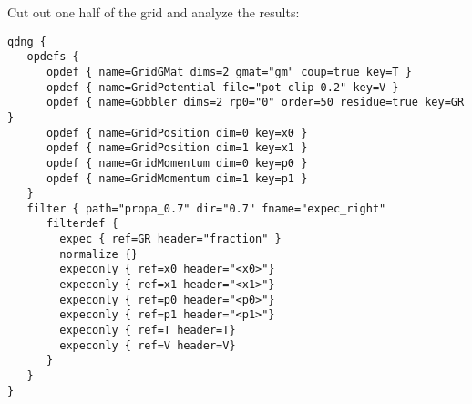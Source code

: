 \documentclass[a4paper,12pt]{scrbook}
\begin{document}
Cut out one half of the grid and analyze the results:
\begin{verbatim}
qdng {                                                                                                                                       
   opdefs {                                                                                                                                  
      opdef { name=GridGMat dims=2 gmat="gm" coup=true key=T }                                      
      opdef { name=GridPotential file="pot-clip-0.2" key=V }                                        
      opdef { name=Gobbler dims=2 rp0="0" order=50 residue=true key=GR }                                                                     
      opdef { name=GridPosition dim=0 key=x0 }                                                                                               
      opdef { name=GridPosition dim=1 key=x1 }                                                                                               
      opdef { name=GridMomentum dim=0 key=p0 }                                                                                               
      opdef { name=GridMomentum dim=1 key=p1 }                                                                                               
   }                                                                                                                                         
   filter { path="propa_0.7" dir="0.7" fname="expec_right"                                         
      filterdef {                                                                                                                  
	    expec { ref=GR header="fraction" }                                                                              
	    normalize {}                                                                                                    
	    expeconly { ref=x0 header="<x0>"}                                                                               
	    expeconly { ref=x1 header="<x1>"}                                                                               
	    expeconly { ref=p0 header="<p0>"}                                                                               
	    expeconly { ref=p1 header="<p1>"}                                                                               
	    expeconly { ref=T header=T}                                                                                     
	    expeconly { ref=V header=V}                                                                                     
      }                                                                                                                  
   }
}
\end{verbatim}
\end{document}
